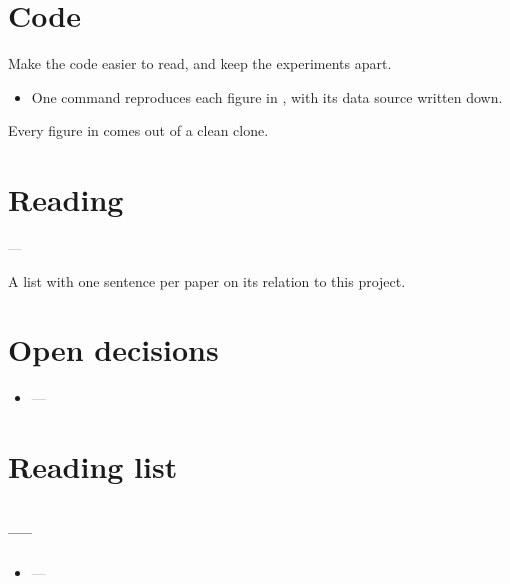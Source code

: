 \documentclass[11pt]{article}
\newcommand{\todo}{$\square$}
\newcommand{\blank}{\textcolor{gray}{---}}
\newcommand{\paper}[2]{\bibentry{#1}\par\textit{#2}}
\newenvironment{fields}
  {\begin{description}[style=sameline, leftmargin=7em, labelwidth=6.5em, font=\normalfont\bfseries]}
  {\end{description}}
\newenvironment{tasks}
  {\begin{itemize}[leftmargin=1.5em, itemsep=2pt]}
  {\end{itemize}}
\begin{document}
\section*{Code}
Make the code easier to read, and keep the experiments apart.
\begin{tasks}
  \item[\todo] One command reproduces each figure in , with its data source written down.
\end{tasks}
\begin{fields}
  \item[Done when] Every figure in  comes out of a clean clone.
\end{fields}

\section*{Reading}
\begin{fields}
  \item[Topics] \blank
  \item[Done when] A list with one sentence per paper on its relation to this project.
\end{fields}

\section*{Open decisions}
\begin{itemize}[leftmargin=1.5em, itemsep=2pt]
  \item \blank
\end{itemize}

\section*{Reading list}
\subsection*{\blank}
\begin{tasks}
  \item[\todo] \blank
\end{tasks}
\end{document}
